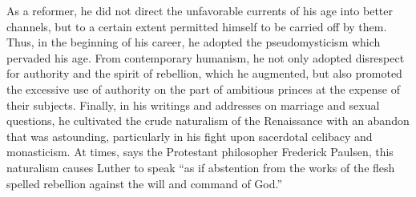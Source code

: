As a reformer, he did not direct the unfavorable currents of his
age into better channels, but to a certain extent permitted himself to
be carried off by them. Thus, in the beginning of his career, he
adopted the pseudomysticism which pervaded his age. From contemporary
humanism, he not only adopted disrespect for authority
and the spirit of rebellion, which he augmented, but also promoted
the excessive use of authority on the part of ambitious princes at the
expense of their subjects. Finally, in his writings and addresses on
marriage and sexual questions, he cultivated the crude naturalism of
the Renaissance with an abandon that was astounding, particularly in
his fight upon sacerdotal celibacy and monasticism. At times, says the
Protestant philosopher Frederick Paulsen, this naturalism causes
Luther to speak “as if abstention from the works of the flesh spelled
rebellion against the will and command of God.”

